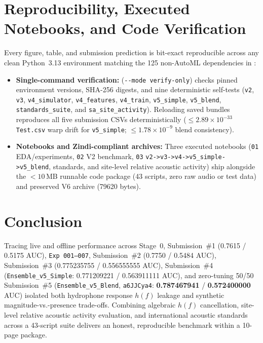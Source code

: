 \documentclass[10pt,a4paper]{article}
\begin{document}
\section{Reproducibility, Executed Notebooks, and Code Verification}

Every figure, table, and submission prediction is bit-exact reproducible across any clean Python~3.13 environment matching the 125 non-AutoML dependencies in :
\begin{itemize}
    \item \textbf{Single-command verification:}  (\texttt{-{}-mode verify-only}) checks pinned environment versions, SHA-256 digests, and nine deterministic self-tests (\texttt{v2}, \texttt{v3}, \texttt{v4\_simulator}, \texttt{v4\_features}, \texttt{v4\_train}, \texttt{v5\_simple}, \texttt{v5\_blend}, \texttt{standards\_suite}, and \texttt{sa\_site\_activity}). Reloading saved bundles reproduces all five submission CSVs deterministically ($\le 2.89 \times 10^{-33}$ \texttt{Test.csv} warp drift for \texttt{v5\_simple}; $\le 1.78\times 10^{-9}$ blend consistency).
    \item \textbf{Notebooks and Zindi-compliant archives:} Three executed notebooks (\texttt{01} EDA/experiments, \texttt{02} V2 benchmark, \texttt{03} \texttt{v2->v3->v4->v5\_simple->v5\_blend}, standards, and site-level relative acoustic activity) ship alongside the $<10$\,MB runnable code package  (43 scripts, zero raw audio or test data) and preserved V6 archive  (79620 bytes).
\end{itemize}

\section{Conclusion}

Tracing live and offline performance across Stage~0, Submission~\#1 (0.7615 / 0.5175 AUC), \texttt{Exp~001--007}, Submission~\#2 (0.7750 / 0.5484 AUC), Submission~\#3 (0.775235755 / 0.556555555 AUC), Submission~\#4 (\texttt{Ensemble\_v5\_Simple}: 0.771209221 / 0.563911111 AUC), and zero-tuning 50/50 Submission~\#5 (\texttt{Ensemble\_v5\_Blend}, \texttt{a6JJCya4}: \textbf{0.787467941} / \textbf{0.572400000} AUC) isolated both hydrophone response $h(f)$ leakage and synthetic magnitude-vs.-presence trade-offs. Combining algebraic $h(f)$ cancellation, site-level relative acoustic activity evaluation, and international acoustic standards across a 43-script suite delivers an honest, reproducible benchmark within a 10-page package.

\printbibliography[heading=bibintoc,title={References}]
\end{document}
